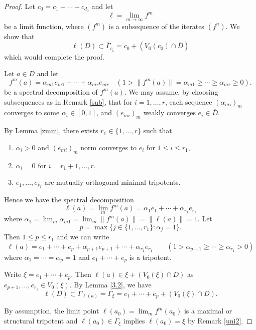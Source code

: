 \documentclass[12pt, twoside]{article}
\theoremstyle{definition}
\numberwithin{equation}{section}
\begin{document}
\begin{proof}
Let $c_0 = c_1 + \cdots + c_{d_0}$ and let
$$\ell=\lim_{m\rightarrow \infty} f^{m}$$ be a limit function,
 where  $(f^{m})$ is a  subsequence of the iterates $(f^n)$.
We show that
 $$\ell(D) \subset \overline\Gamma_{c_{_0}} =c_0 + (V_0(c_0) \cap \overline D)  $$
which would complete the proof.

Let $a\in D$ and let
\begin{equation}\label{ite}
f^m(a) = \alpha_{m1}e_{m1} + \cdots +\alpha_{mr}e_{mr}\quad (1>\|f^m(a)\|=\alpha_{m1} \geq \cdots \geq \alpha_{mr} \geq 0).
\end{equation}
be a spectral decomposition of $f^m(a)$. We may assume, by choosing subsequences as in Remark \ref{sub},
that for $i=1, \ldots, r$, each sequence $(\alpha_{mi})_m$ converges to some $\alpha_i \in [0, 1]$,
and $(e_{mi})_m$ weakly converges $e_i  \in \overline D$.

By Lemma \ref{zmm},
there exists $r_1\in \{1, \ldots, r\}$ such that
\begin{enumerate}
\item[(i)] $\alpha_i >0$ and $(e_{mi})_m$ norm converges to $e_i$ for $1\leq i\leq r_1$,
\item[(ii)] $\alpha_{i} =0$ for $i = r_1+1, \ldots, r$.
\item[(iii)] $e_1, \ldots, e_{r_1}$ are mutually orthogonal minimal tripotents.
\end{enumerate}
Hence we have the spectral decomposition
$$ \ell(a)= \lim_m f^m(a) = \alpha_1e_1 +\cdots +\alpha_{r_1} e_{r_1}$$
where $\alpha_1 = \lim_m \alpha_{m1} =\lim_{m} \|f^m(a)\| = \|\ell(a)\|=1$.
Let
$$p= \max \{j\in \{1, \ldots, r_1\}: \alpha_j=1\}.$$
Then $1\leq p\leq r_1$ and  we can write
\begin{equation*}\label{axi}
\ell(a) = e_1 + \cdots + e_p + \alpha_{p+1}e_{p+1} + \cdots + \alpha_{r_1}e_{r_1} \qquad (1> \alpha_{p+1} \geq \cdots
\geq \alpha_{r_1}>0)
\end{equation*}
where $\alpha_1 = \cdots = \alpha_p =1$ and $e_1 + \cdots + e_p$ is a tripotent.

Write $\xi = e_1 + \cdots +e_p$. Then $\ell (a) \in \xi+(V_0(\xi) \cap D) $ as $e_{p+1}, \ldots, e_{r_1} \in V_0(\xi)$.
 By Lemma \ref{3.2}, we have
\begin{equation}\label{3..2}
\ell(D) \subset \Gamma_{\ell(a)} = \Gamma_\xi= e_1 + \cdots + e_p + (V_0(\xi) \cap D).
\end{equation}

By assumption, the limit point $\ell(a_0)= \lim_m f^m(a_0)$ is a maximal or structural tripotent and
$\ell(a_0) \in \Gamma_\xi$ implies $\ell(a_0) = \xi$ by Remark \ref{uni2}.



\end{proof}
\end{document}
